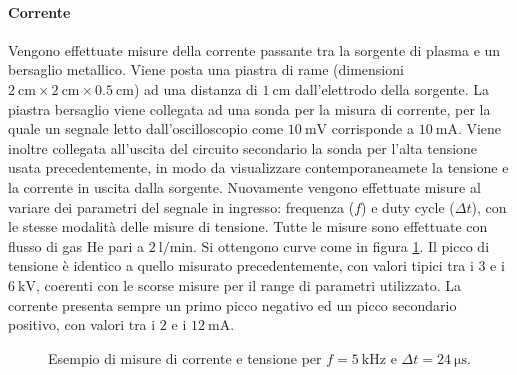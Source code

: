 \paragraph{Corrente}Vengono effettuate misure della corrente passante tra la sorgente di plasma e un bersaglio metallico. Viene posta una piastra di rame (dimensioni $\SI{2}{\centi\metre} \times \SI{2}{\centi\metre} \times \SI{0.5}{\centi\metre}$) ad una distanza di $\SI{1}{\centi\metre}$ dall'elettrodo della sorgente. La piastra bersaglio viene collegata ad una sonda per la misura di corrente, per la quale un segnale letto dall'oscilloscopio come $\SI{10}{\milli\volt}$ corrisponde a $\SI{10}{\milli\ampere}$.
Viene inoltre collegata all'uscita del circuito secondario la sonda per l'alta tensione usata precedentemente, in modo da visualizzare contemporaneamete la tensione e la corrente in uscita dalla sorgente. Nuovamente vengono effettuate misure al variare dei parametri del segnale in ingresso: frequenza ($f$) e duty cycle ($\Delta t$), con le stesse modalità delle misure di tensione.
Tutte le misure sono effettuate con flusso di gas He pari a $\SI{2}{\litre/\minute}$.
Si ottengono curve come in figura \ref{fig:corrente_es}. Il picco di tensione è identico a quello misurato precedentemente, con valori tipici tra i $\num{3}$ e i $\SI{6}{\kilo\volt}$, coerenti con le scorse misure per il range di parametri utilizzato. La corrente presenta sempre un primo picco negativo ed un picco secondario positivo, con valori tra i $\num{2}$ e i $\SI{12}{\milli\ampere}$.

\begin{figure}
\centering
{}
\caption{Esempio di misure di corrente e tensione per $f = \SI{5}{\kilo\hertz}$ e $\Delta t = \SI{24}{\micro\second}$.}
\label{fig:corrente_es}
\end{figure}


